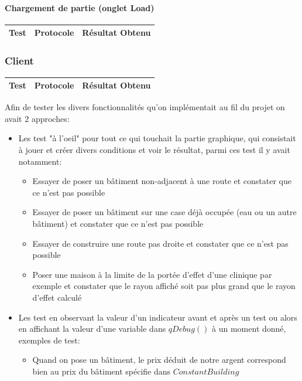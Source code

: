 \documentclass[a4paper,10pt,openany,oneside]{report}
\begin{document}
\paragraph{Chargement de partie (onglet Load)}
\begin{center}
	\begin{tabular}{| p{3cm} | p{6cm} | p{6cm} |}
	\hline
		 \textbf{Test} & \textbf{Protocole} & \textbf{Résultat Obtenu}
		 \\ \hline
		\hline
	\end{tabular}
\end{center}

\subsubsection{Client}
\begin{center}
	\begin{tabular}{| p{3cm} | p{6cm} | p{6cm} |}
	\hline
		 \textbf{Test} & \textbf{Protocole} & \textbf{Résultat Obtenu}
		 \\ \hline
		\hline
	\end{tabular}
\end{center}

Afin de tester les divers fonctionnalités qu'on implémentait au fil du projet on avait 2 approches:
\begin{itemize}
\item Les test "à l'oeil" pour tout ce qui touchait la partie graphique, qui consistait à jouer et créer divers conditions et voir le résultat, parmi ces test il y avait notamment:
\begin{itemize}
\item Essayer de poser un bâtiment non-adjacent à une route et constater que ce n'est pas possible
\item Essayer de poser un bâtiment sur une case déjà occupée (eau ou un autre bâtiment) et constater que ce n'est pas possible
\item Essayer de construire une route pas droite et constater que ce n'est pas possible
\item Poser une maison à la limite de la portée d'effet d'une clinique par exemple et constater que le rayon affiché soit pas plus grand que le rayon d'effet calculé
\end{itemize}
\item Les test en observant la  valeur d'un indicateur avant et après un test ou alors en affichant la valeur d'une variable dans $qDebug()$ à un moment donné, exemples de test:
\begin{itemize}
\item Quand on pose un bâtiment, le prix déduit de notre argent correspond bien au prix du bâtiment spécifie dans $ConstantBuilding$
\end{itemize}
\end{itemize}
\end{document}
